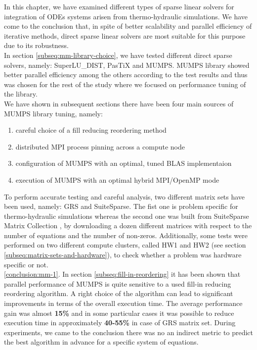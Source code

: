 \label{subseq:mm-conclusion}

In this chapter, we have examined different types of sparse linear solvers for integration of ODEs systems arisen from thermo-hydraulic simulations. We have come to the conclusion that, in spite of better scalability and parallel efficiency of iterative methods, direct sparse linear solvers are most suitable for this purpose due to its robustness.\\


In section \ref{subseq:mm-library-choice}, we have tested different direct sparse solvers, namely: SuperLU\_DIST, PasTiX and MUMPS. MUMPS library showed better parallel efficiency among the others according to the test results and thus was chosen for the rest of the study where we focused on performance tuning of the library.\\


We have shown in subsequent sections there have been four main sources of MUMPS library tuning, namely:

\begin{enumerate}
	\item careful choice of a fill reducing reordering method \label{conclusion:mm-1}
	\item distributed MPI process pinning across a compute node \label{conclusion:mm-2}
	\item configuration of MUMPS with an optimal, tuned BLAS implementaion \label{conclusion:mm-3}
	\item execution of MUMPS with an optimal hybrid MPI/OpenMP mode \label{conclusion:mm-4}
\end{enumerate}


To perform accurate testing and careful analysis, two different matrix sets have been used, namely: GRS and SuiteSparse. The fist one is problem specific for thermo-hydraulic simulations whereas the second one was built from SuiteSparse Matrix Collection \cite{sparse-matrix-collection:1}, \cite{sparse-matrix-collection:2} by downloading a dozen different matrices with respect to the number of equations and the number of non-zeros. Additionally, some tests were performed on two different compute clusters, called HW1 and HW2 (see section \ref{subseq:matrix-sets-and-hardware}), to check whether a problem was hardware specific or not.\\



\ref{conclusion:mm-1}. In section \ref{subseq:fill-in-reordering} it has been shown that parallel performance of MUMPS is quite sensitive to a used fill-in reducing reordering algorithm. A right choice of the algorithm can lead to significant improvements in terms of the overall execution time. The average performance gain was almost \textbf{15\%} and in some particular cases it was possible to reduce execution time in approximately \textbf{40-55\%} in case of GRS matrix set. During experiments, we came to the conclusion there was no an indirect metric to predict the best algorithm in advance for a specific system of equations.\\


